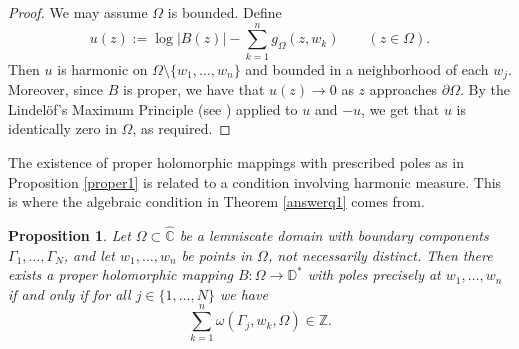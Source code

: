 \documentclass{amsart}
\theoremstyle{plain}
\newtheorem{proposition}[theorem]{Proposition}
\theoremstyle{definition}
\theoremstyle{remark}
\newcommand{\mZ}{\mathbb{Z}}
\newcommand{\mD}{\mathbb{D}}
\newcommand{\hC}{\widehat{\mathbb{C}}}
\begin{document}
\begin{proof}
We may assume $\Omega$ is bounded. Define
$$
u(z):=\log{|B(z)|} - \sum_{k=1}^n g_{\Omega}(z,w_k) \qquad (z \in \Omega).
$$
Then $u$ is harmonic on $\Omega \setminus \{w_1, \dots, w_n\}$ and bounded in a neighborhood of each $w_j$. Moreover, since $B$ is proper, we have that $u(z) \to 0$ as $z$ approaches $\partial \Omega$. By the Lindel{\"o}f's Maximum Principle (see \cite[Chapter I, Lemma 1.1]{GarnettMarshall2005}) applied to $u$ and $-u$, we get that $u$ is identically zero in $\Omega$, as required.
\end{proof}

The existence of proper holomorphic mappings with prescribed poles as in Proposition \ref{proper1} is related to a condition involving harmonic measure. This is where the algebraic condition in Theorem \ref{answerq1} comes from.

\begin{proposition}
\label{proper2}
Let $\Omega \subset \hC$ be a lemniscate domain with boundary components $\Gamma_1, \dots, \Gamma_N$, and let $w_1, \dots, w_n$ be points in $\Omega$, not necessarily distinct. Then there exists a proper holomorphic mapping $B:\Omega \to \mD^*$ with poles precisely at $w_1, \dots, w_n$ if and only if for all $j \in \{1, \dots, N\}$ we have
\begin{equation}
\label{eqhm}
\sum_{k=1}^n \omega(\Gamma_j, w_k, \Omega) \in \mZ.
\end{equation}


\end{proposition}
\end{document}
